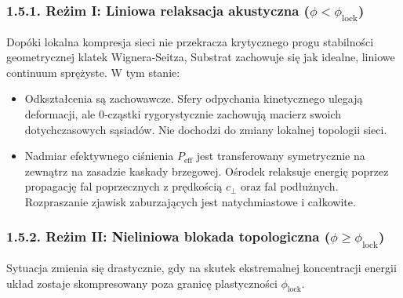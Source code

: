\documentclass[
  letterpaper,
  DIV=11,
  numbers=noendperiod]{scrartcl}
\providecommand{\tightlist}{%
  \setlength{\itemsep}{0pt}\setlength{\parskip}{0pt}}
\numberwithin{equation}{subsection}
\begin{document}
\subsubsection{\texorpdfstring{1.5.1. Reżim I: Liniowa relaksacja
akustyczna
(\(\phi < \phi_{\text{lock}}\))}{1.5.1. Reżim I: Liniowa relaksacja akustyczna (\textbackslash phi \textless{} \textbackslash phi\_\{\textbackslash text\{lock\}\})}}\label{reux17cim-i-liniowa-relaksacja-akustyczna-phi-phi_textlock}

Dopóki lokalna kompresja sieci nie przekracza krytycznego progu
stabilności geometrycznej klatek Wignera‑Seitza, Substrat zachowuje się
jak idealne, liniowe continuum sprężyste. W tym stanie:

\begin{itemize}
\tightlist
\item
  Odkształcenia są zachowawcze. Sfery odpychania kinetycznego ulegają
  deformacji, ale 0‑cząstki rygorystycznie zachowują macierz swoich
  dotychczasowych sąsiadów. Nie dochodzi do zmiany lokalnej topologii
  sieci.
\item
  Nadmiar efektywnego ciśnienia \(P_{\text{eff}}\) jest transferowany
  symetrycznie na zewnątrz na zasadzie kaskady brzegowej. Ośrodek
  relaksuje energię poprzez propagację fal poprzecznych z prędkością
  \(c_{\perp}\) oraz fal podłużnych. Rozpraszanie zjawisk zaburzających
  jest natychmiastowe i całkowite.
\end{itemize}

\subsubsection{\texorpdfstring{1.5.2. Reżim II: Nieliniowa blokada
topologiczna
(\(\phi \ge \phi_{\text{lock}}\))}{1.5.2. Reżim II: Nieliniowa blokada topologiczna (\textbackslash phi \textbackslash ge \textbackslash phi\_\{\textbackslash text\{lock\}\})}}\label{reux17cim-ii-nieliniowa-blokada-topologiczna-phi-ge-phi_textlock}

Sytuacja zmienia się drastycznie, gdy na skutek ekstremalnej
koncentracji energii układ zostaje skompresowany poza granicę
plastyczności \(\phi_{\text{lock}}\).
\end{document}
